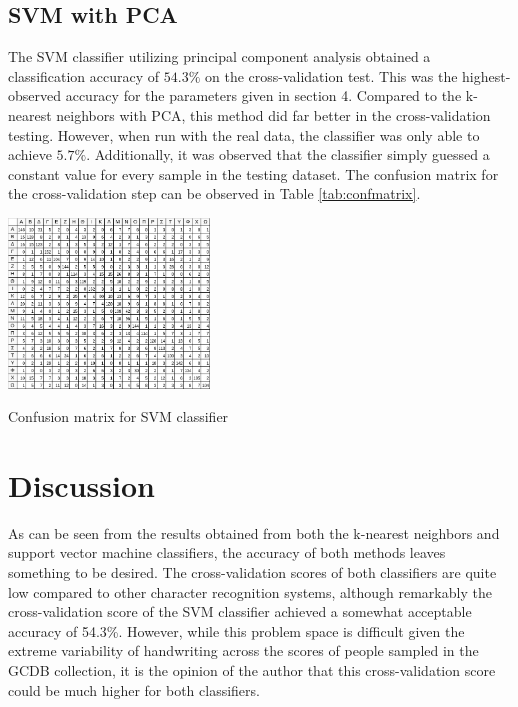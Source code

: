\documentclass[10pt,twocolumn,letterpaper]{article}
\begin{document}
\subsection{SVM with PCA}
The SVM classifier utilizing principal component analysis obtained a classification accuracy of $54.3\%$ on the cross-validation test. This was the highest-observed accuracy for the parameters given in section 4. Compared to the k-nearest neighbors with PCA, this method did far better in the cross-validation testing. However, when run with the real data, the classifier was only able to achieve $5.7\%$. Additionally, it was observed that the classifier simply guessed a constant value for every sample in the testing dataset. The confusion matrix for the cross-validation step can be observed in Table \ref{tab:confmatrix}.

\begin{table}
    \centering
    \includegraphics[width=0.4\textwidth]{res/table1.png}
    \caption{Confusion matrix for SVM classifier}
    \label{tab:confmatrix}
\end{table}

\section{Discussion}

As can be seen from the results obtained from both the k-nearest neighbors and support vector machine classifiers, the accuracy of both methods leaves something to be desired. The cross-validation scores of both classifiers are quite low compared to other character recognition systems, although remarkably the cross-validation score of the SVM classifier achieved a somewhat acceptable accuracy of 54.3\%. However, while this problem space is difficult given the extreme variability of handwriting across the scores of people sampled in the GCDB collection, it is the opinion of the author that this cross-validation score could be much higher for both classifiers.
\end{document}
